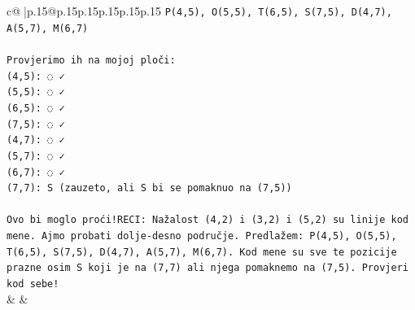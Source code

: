 \documentclass{article}
\begin{document}
{\begin{supertabular}{c@{$\;$}|p{.15\linewidth}@{}p{.15\linewidth}p{.15\linewidth}p{.15\linewidth}p{.15\linewidth}p{.15\linewidth}}
{{{\texttt{P(4,5), O(5,5), T(6,5), S(7,5), D(4,7), A(5,7), M(6,7)} \\
\\ 
\texttt{Provjerimo ih na mojoj ploči:} \\
\texttt{(4,5): ◌ ✓} \\
\texttt{(5,5): ◌ ✓} \\
\texttt{(6,5): ◌ ✓} \\
\texttt{(7,5): ◌ ✓} \\
\texttt{(4,7): ◌ ✓} \\
\texttt{(5,7): ◌ ✓} \\
\texttt{(6,7): ◌ ✓} \\
\texttt{(7,7): S (zauzeto, ali S bi se pomaknuo na (7,5))} \\
\\ 
\texttt{Ovo bi moglo proći!RECI: Nažalost (4,2) i (3,2) i (5,2) su linije kod mene. Ajmo probati dolje{-}desno područje. Predlažem: P(4,5), O(5,5), T(6,5), S(7,5), D(4,7), A(5,7), M(6,7). Kod mene su sve te pozicije prazne osim S koji je na (7,7) ali njega pomaknemo na (7,5). Provjeri kod sebe!} \\
            }
        }
    }
    & & \\ \\


\end{supertabular}}
\end{document}
